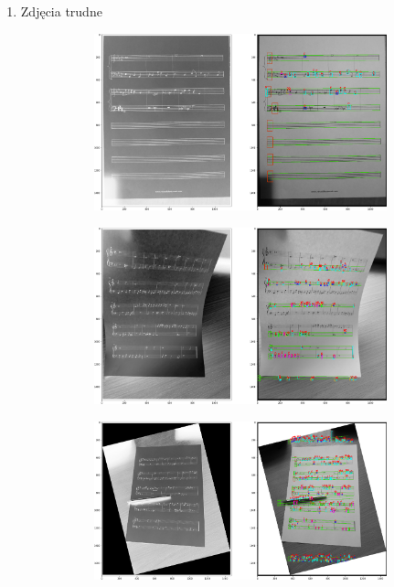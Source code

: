 \documentclass[12pt]{article}
\begin{document}
\begin{enumerate}
			\clearpage
			\item{Zdjęcia trudne}
			\begin{figure}
				\begin{subfigure}[b]{0.48\linewidth}
					\includegraphics[width=\linewidth]{Hard/Zdj0.png}
				\end{subfigure}
				\begin{subfigure}[b]{0.48\linewidth}
					\includegraphics[width=\linewidth]{Hard/Zdj1.png}
				\end{subfigure}
				\begin{subfigure}[b]{0.48\linewidth}
					\includegraphics[width=\linewidth]{Hard/Zdj2.png}

\end{subfigure}
\end{figure}
\end{enumerate}
\end{document}
